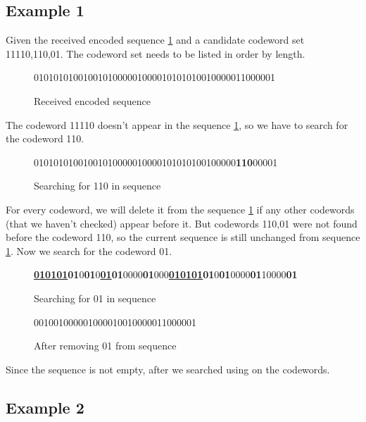 \documentclass[10pt,letterpaper,notitlepage,draft]{article}
\theoremstyle{definition}
\begin{document}
\subsection{Example 1}

Given the received encoded sequence \ref{c1} and a candidate codeword set {11110,110,01}. The codeword set needs to be listed in order by length.
\begin{figure}[h!]
\begin{center}
0101010100100101000001000010101010010000011000001
\end{center}
\caption{Received encoded sequence}\label{c1}
\end{figure}

The codeword 11110 doesn't appear in the sequence \ref{c1}, so we have to search for the codeword 110.

\begin{figure}[h!]
\begin{center}
01010101001001010000010000101010100100000{\bf 110}00001
\end{center}
\caption{Searching for 110 in sequence }\label{c2}
\end{figure}

For every codeword, we will delete it from the sequence \ref{c1} if any other codewords (that we haven't checked) appear before it. But codewords {110,01} were not found before the codeword 110, so the current sequence is still unchanged from sequence \ref{c1}. Now we search for the codeword 01. 

\begin{figure}[h!]
\begin{center}
{\bf \underline {010101}01}0{\bf 01}0{\bf\underline{01}01}0000{\bf 01}000{\bf\underline{010101}01}0{\bf 01}0000{\bf 01}10000{\bf 01}
\end{center}
\caption{Searching for 01 in sequence }\label{c3}
\end{figure}

\begin{figure}[h!]
\begin{center}
001001000001000010010000011000001
\end{center}
\caption{After removing 01 from sequence}\label{c3}
\end{figure}

Since the sequence is not empty, after we searched using on the codewords.

\subsection{Example 2}
\end{document}
